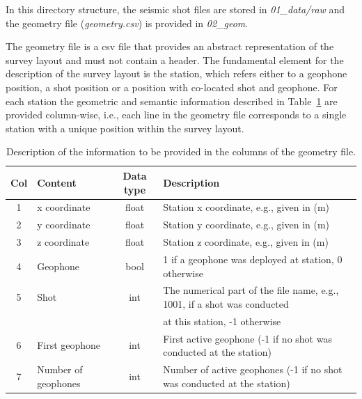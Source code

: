 \documentclass[a4paper,fleqn]{cas-sc}
\begin{document}
In this directory structure, the seismic shot files are stored in \textit{01\_data/raw} and the geometry file (\textit{geometry.csv}) is provided in \textit{02\_geom}.

The geometry file is a csv file that provides an abstract representation of the survey layout and must not contain a header. The fundamental element for the description of the survey layout is the station, which refers either to a geophone position, a shot position or a position with co-located shot and geophone. For each station the geometric and semantic information described in Table~\ref{tab:geometry} are provided column-wise, i.e., each line in the geometry file corresponds to a single station with a unique position within the survey layout. 
\begin{table}[pos=h]
    \caption{Description of the information to be provided in the columns of the geometry file.}
    \centering
    \begin{tabular}{clcl}
        \toprule
        Col & \textbf{Content} & \textbf{Data type} & \textbf{Description} \\
        \midrule
        1 & x coordinate & float & Station x coordinate, e.g., given in (m) \\ 
        2 & y coordinate & float & Station y coordinate, e.g., given in (m) \\ 
        3 & z coordinate & float & Station z coordinate, e.g., given in (m) \\ 
        4 & Geophone & bool & 1 if a geophone was deployed at station, 0 otherwise \\ 
        5 & Shot & int & The numerical part of the file name, e.g., 1001, if a shot was conducted \\
          & & & at this station, -1 otherwise \\ 
        6 & First geophone & int & First active geophone (-1 if no shot was conducted at the station) \\ 
        7 & Number of geophones & int & Number of active geophones (-1 if no shot was conducted at the station) \\
        \bottomrule
    \end{tabular}
    \label{tab:geometry}
\end{table}
\end{document}
